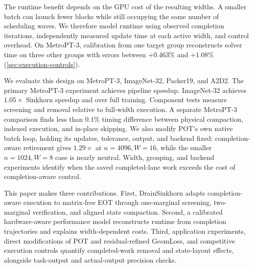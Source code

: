 The runtime benefit depends on the GPU cost of the resulting widths. A smaller batch can launch fewer blocks while still occupying the same number of scheduling waves. We therefore model runtime using observed completion iterations, independently measured update time at each active width, and control overhead. On MetroPT-3, calibration from one target group reconstructs solver time on three other groups with errors between $+0.463\%$ and $+1.08\%$ (\cref{sec:execution-controls}).

We evaluate this design on MetroPT-3, ImageNet-32, Packer19, and A2D2. The primary MetroPT-3 experiment achieves \CMetroCorrectedEndpointSpeedup{} pipeline speedup. ImageNet-32 achieves $1.05\times$ Sinkhorn speedup and \CFeatureTrainingActiveOverStatic{} over full training. Component tests measure screening and removal relative to full-width execution. A separate MetroPT-3 comparison finds less than $0.1\%$ timing difference between physical compaction, indexed execution, and in-place skipping. We also modify POT's own native batch loop, holding its updates, tolerance, output, and backend fixed: completion-aware retirement gives $1.29\times$ at $n=4096,W=16$, while the smaller $n=1024,W=8$ case is nearly neutral. Width, grouping, and backend experiments identify when the saved completed-lane work exceeds the cost of completion-aware control.

This paper makes three contributions. First, DrainSinkhorn adapts completion-aware execution to matrix-free EOT through one-marginal screening, two-marginal verification, and aligned state compaction. Second, a calibrated hardware-aware performance model reconstructs runtime from completion trajectories and explains width-dependent costs. Third, application experiments, direct modifications of POT and residual-refined GeomLoss, and competitive execution controls quantify completed-work removal and state-layout effects, alongside task-output and actual-output precision checks.
